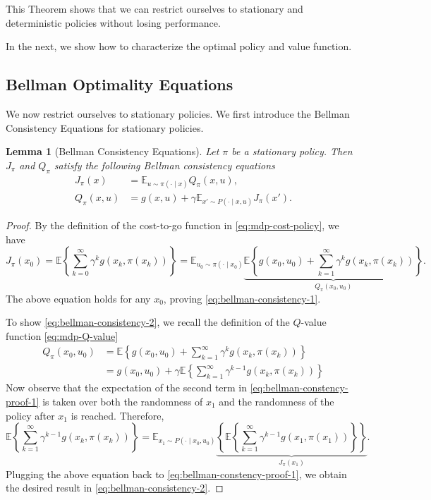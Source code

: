 \documentclass[
]{book}
\newtheorem{lemma}{Lemma}[chapter]
\theoremstyle{definition}
\theoremstyle{definition}
\theoremstyle{definition}
\theoremstyle{definition}
\theoremstyle{remark}
\begin{document}
This Theorem shows that we can restrict ourselves to stationary and deterministic policies without losing performance.

In the next, we show how to characterize the optimal policy and value function.

\hypertarget{bellman-optimality-equations}{%
\subsection{Bellman Optimality Equations}\label{bellman-optimality-equations}}

We now restrict ourselves to stationary policies. We first introduce the Bellman Consistency Equations for stationary policies.

\begin{lemma}[Bellman Consistency Equations]
\protect\hypertarget{lem:mdpbellmanconsistency}{}\label{lem:mdpbellmanconsistency}Let \(\pi\) be a stationary policy. Then \(J_\pi\) and \(Q_\pi\) satisfy the following Bellman consistency equations
\begin{align}
J_\pi(x) &= \mathbb{E}_{u \sim \pi(\cdot \mid x)} Q_\pi(x,u), \label{eq:bellman-consistency-1} \\
Q_\pi(x,u) &=g(x,u) + \gamma \mathbb{E}_{x' \sim P(\cdot \mid x,u)} J_\pi(x'). \label{eq:bellman-consistency-2}
\end{align}
\end{lemma}

\begin{proof}
By the definition of the cost-to-go function in \eqref{eq:mdp-cost-policy}, we have
\[
J_\pi(x_0) = \mathbb{E}\left\{ \sum_{k=0}^{\infty} \gamma^k g(x_k, \pi(x_k))  \right\} = \mathbb{E}_{u_0 \sim \pi(\cdot \mid x_0)} \underbrace{\mathbb{E} \left\{ g(x_0,u_0) + \sum_{k=1}^{\infty} \gamma^k g(x_k,\pi(x_k)) \right\}}_{Q_\pi(x_0,u_0)}.
\]
The above equation holds for any \(x_0\), proving \eqref{eq:bellman-consistency-1}.

To show \eqref{eq:bellman-consistency-2}, we recall the definition of the \(Q\)-value function \eqref{eq:mdp-Q-value}
\begin{align}
Q_\pi(x_0,u_0) & = \mathbb{E} \left\{ g(x_0,u_0) + \sum_{k=1}^{\infty} \gamma^k g(x_k,\pi(x_k)) \right\}  \\
&=  g(x_0,u_0) + \gamma \mathbb{E} \left\{ \sum_{k=1}^{\infty} \gamma^{k-1} g(x_k,\pi(x_k)) \right\} \label{eq:bellman-constency-proof-1}
\end{align}
Now observe that the expectation of the second term in \eqref{eq:bellman-constency-proof-1} is taken over both the randomness of \(x_1\) and the randomness of the policy after \(x_1\) is reached. Therefore,
\[
\mathbb{E} \left\{ \sum_{k=1}^{\infty} \gamma^{k-1} g(x_k,\pi(x_k)) \right\} = \mathbb{E}_{x_1 \sim P(\cdot \mid x_0,u_0)} \underbrace{\left\{ \mathbb{E} \left\{ \sum_{k=1}^{\infty} \gamma^{k-1} g(x_1,\pi(x_1)) \right\} \right\}}_{J_\pi(x_1)}.
\]
Plugging the above equation back to \eqref{eq:bellman-constency-proof-1}, we obtain the desired result in \eqref{eq:bellman-consistency-2}.
\end{proof}
\end{document}

